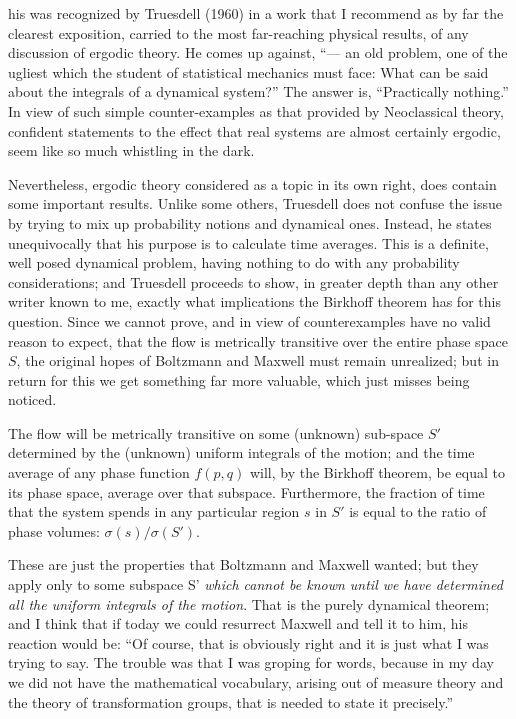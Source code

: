 his was recognized by Truesdell (\cite{truesdell}{1960}) in a work that I recommend as by far the clearest exposition, carried to the most far-reaching physical results, of any discussion of ergodic theory.
He comes up against, ``--- an old problem, one of the ugliest which the student of statistical mechanics must face: What can be said about the integrals of a dynamical system?''
The answer is, ``Practically nothing.''
In view of such simple counter-examples as that provided by Neoclassical theory, confident statements to the effect that real systems are almost certainly ergodic, seem like so much whistling in the dark.

Nevertheless, ergodic theory considered as a topic in its own right, does contain some important results.
Unlike some others, Truesdell does not confuse the issue by trying to mix up probability notions and dynamical ones.
Instead, he states unequivocally that his purpose is to calculate time averages.
This is a definite, well posed dynamical problem, having nothing to do with any probability considerations; and Truesdell proceeds to show, in greater depth than any other writer known to me, exactly what implications the Birkhoff theorem has for this question.
Since we cannot prove, and in view of counterexamples have no valid reason to expect, that the flow is metrically transitive over the entire phase space $S$, the original hopes of Boltzmann and Maxwell must remain unrealized; but in return for this we get something far more valuable, which just misses being noticed.

The flow will be metrically transitive on some (unknown) sub-space $S'$ determined by the (unknown) uniform integrals of the motion; and the time average of any phase function $f(p,q)$ will, by the Birkhoff theorem, be equal to its phase space, average over that subspace.
Furthermore, the fraction of time that the system spends in any particular region $s$ in $S'$ is equal to the ratio of phase volumes: $\sigma(s)/\sigma(S')$.

These are just the properties that Boltzmann and Maxwell wanted; but they apply only to some subspace S' \emph{which cannot be known until we have determined all the uniform integrals of the motion}. That is the purely dynamical theorem; and I think that if today we could resurrect Maxwell and tell it to him, his reaction would be: ``Of course, that is obviously right and it is just what I was trying to say. The trouble was that I was groping for words, because in my day we did not have the mathematical vocabulary, arising out of measure theory and the theory of transformation groups, that is needed to state it precisely.''

